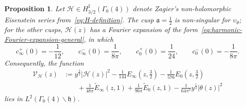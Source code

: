 \documentclass[11pt,reqno]{amsart}
\theoremstyle{plain}
\newtheorem{proposition}[theorem]{Proposition}
\theoremstyle{definition}
\numberwithin{equation}{section}
\begin{document}
\begin{proposition} \label{prop:H-cusp-behavior}
Let $\mathcal{H} \in H_{3/2}^\sharp(\Gamma_0(4))$ denote Zagier's non-holomorphic Eisenstein series from~\eqref{eq:H-definition}. The cusp $\mathfrak{a} = \frac{1}{2}$ is non-singular for $\upsilon_\theta$; for the other cusps, $\mathcal{H}(z)$ has a Fourier expansion of the form~\eqref{eq:harmonic-Fourier-expansion-general}, in which
\[
	c_\infty^+(0) = - \frac{1}{12}, \qquad
	c_\infty^-(0) = \frac{1}{8\pi}, \qquad
	c_0^+(0) = \frac{1}{24}, \qquad
	c_0^-(0) = -\frac{1}{8\pi}.
\]
Consequently, the function
\begin{align}
	\mathcal{V}_\mathcal{H}(z) &:= y^{\frac{3}{2}} \vert \mathcal{H}(z) \vert^2 
		 - \frac{1}{144} E_\infty(z,\tfrac{3}{2}) - \frac{1}{576} E_0(z,\tfrac{3}{2}) \\
		& \qquad + \frac{1}{48 \pi} \widetilde{E}_\infty(z,1) + \frac{1}{96 \pi} \widetilde{E}_0(z,1)
		- \frac{1}{64 \pi^2} y^{\frac{1}{2}} \vert \theta(z) \vert^2
\end{align}
lies in $L^2(\Gamma_0(4) \backslash \mathfrak{h})$.
\end{proposition}
\end{document}
